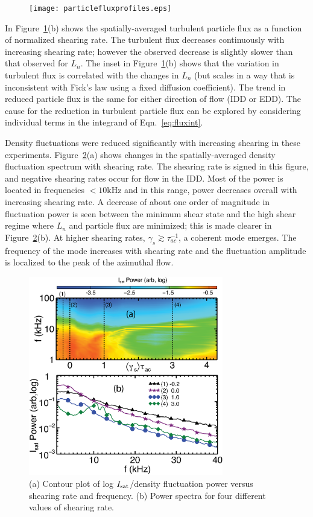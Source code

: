 \documentclass[aip,pop,amsmath,amssymb,preprint,superscriptaddress]{revtex4-1} %
\begin{document}
\begin{figure}[!htbp]
\centerline{
\texttt{[image: particlefluxprofiles.eps]}}
\caption{\label{fig:sheargradflux}}
\end{figure}

In Figure~\ref{fig:sheargradflux}(b) shows the spatially-averaged turbulent
particle flux as a function of normalized shearing rate.  The
turbulent flux decreases continuously with increasing shearing rate;
however the observed decrease is slightly slower than that observed
for $L_n$.  The inset in Figure~\ref{fig:sheargradflux}(b) shows that the variation in
turbulent flux is correlated with the changes in $L_n$ (but scales in a way
that is inconsistent with Fick's law using a fixed diffusion coefficient).  The
trend in reduced particle flux is the same for either direction of
flow (IDD or EDD).  The cause for the reduction in turbulent particle
flux can be explored by considering individual terms in the integrand
of Eqn.~\ref{eq:fluxint}.

Density fluctuations were reduced significantly with increasing
shearing in these experiments.  Figure~\ref{fig:powercontour}(a) shows
changes in the spatially-averaged density fluctuation spectrum
with shearing rate.  The shearing rate is signed in this figure, and
negative shearing rates occur for flow in the IDD. Most of the power
is located in frequencies $<10$kHz and in this range, power decreases
overall with increasing shearing rate.  A decrease of about one order
of magnitude in fluctuation power is seen between the minimum shear
state and the high shear regime where $L_n$ and particle flux are
minimized; this is made clearer in Figure~\ref{fig:powercontour}(b).  At
higher shearing rates, $\gamma_{s} \gtrsim \tau_{ac}^{-1}$, a coherent
mode emerges.  The frequency of the mode increases with shearing rate
and the fluctuation amplitude is localized to the peak of the
azimuthal flow.

\begin{figure}[!htbp]
\centerline{
\includegraphics[width=8.5cm]{figure4.eps}}
\caption{\label{fig:powercontour} (a) Contour plot of log $I_{\rm sat}$/density fluctuation power versus shearing rate and frequency. (b) Power spectra for four different values of shearing rate.}
\end{figure}
\end{document}
